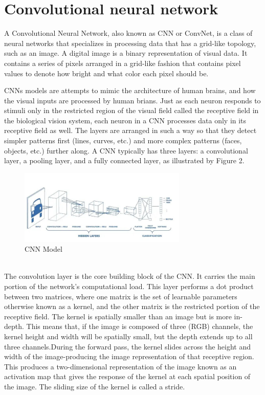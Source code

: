 \documentclass[letterpaper]{article} %
\begin{document}
\section{Convolutional neural network}
A Convolutional Neural Network, also known as CNN or ConvNet, is a class of neural networks that specializes in processing data that has a grid-like topology, such as an image. A digital image is a binary representation of visual data. It contains a series of pixels arranged in a grid-like fashion that contains pixel values to denote how bright and what color each pixel should be.

CNNs models are attempts to mimic the architecture of human brains, and how the visual inputs are processed by human brians. Just as each neuron responds to stimuli only in the restricted region of the visual field called the receptive field in the biological vision system, each neuron in a CNN processes data only in its receptive field as well. The layers are arranged in such a way so that they detect simpler patterns first (lines, curves, etc.) and more complex patterns (faces, objects, etc.) further along.
A CNN typically has three layers: a convolutional layer, a pooling layer, and a fully connected layer, as illustrated by Figure 2.

\begin{figure}[h]
\caption{CNN Model}
\centering
\includegraphics[width=8cm]{cnns.jpg}  
\end{figure}

\\
The convolution layer is the core building block of the CNN. It carries the main portion of the network’s computational load.
This layer performs a dot product between two matrices, where one matrix is the set of learnable parameters otherwise known as a kernel, and the other matrix is the restricted portion of the receptive field. The kernel is spatially smaller than an image but is more in-depth. This means that, if the image is composed of three (RGB) channels, the kernel height and width will be spatially small, but the depth extends up to all three channels.During the forward pass, the kernel slides across the height and width of the image-producing the image representation of that receptive region. This produces a two-dimensional representation of the image known as an activation map that gives the response of the kernel at each spatial position of the image. The sliding size of the kernel is called a stride.
\end{document}

